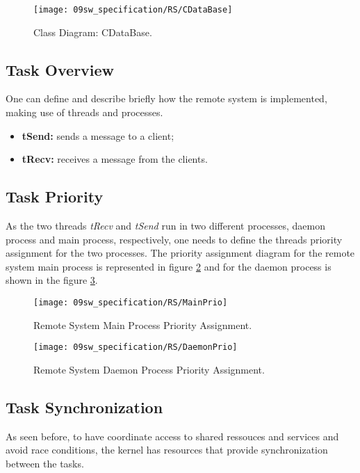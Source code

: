 \begin{figure}[H]
	\centering
	\texttt{[image: 09sw\_specification/RS/CDataBase]}
	\caption{Class Diagram: CDataBase.}
	\label{fig:CDataBase}
\end{figure}

\subsection{Task Overview}
One can define and describe briefly how the remote system is implemented, making use of threads and processes. 

\begin{itemize}
	\item \textbf{tSend:} sends a message to a client;
	\item \textbf{tRecv:} receives a message from the clients.
\end{itemize}

\subsection{Task Priority}
As the two threads \textit{tRecv} and \textit{tSend} run in two different processes, daemon process and main process, respectively, one needs to define the threads priority assignment for the two processes. The priority assignment diagram for the remote system main process is represented in figure \ref{fig:rsMainPrio} and for the daemon process is shown in the figure \ref{fig:rsDaemonPrio}. 

\begin{figure}[H]
	\centering
	\texttt{[image: 09sw\_specification/RS/MainPrio]}
	\caption{Remote System Main Process Priority Assignment.}
	\label{fig:rsMainPrio}
\end{figure}

\begin{figure}[H]
	\centering
	\texttt{[image: 09sw\_specification/RS/DaemonPrio]}
	\caption{Remote System Daemon Process Priority Assignment.}
	\label{fig:rsDaemonPrio}
\end{figure}

\subsection{Task Synchronization}
As seen before, to have coordinate access to shared ressouces and services and avoid race conditions, the kernel has resources that provide synchronization between the tasks. 

